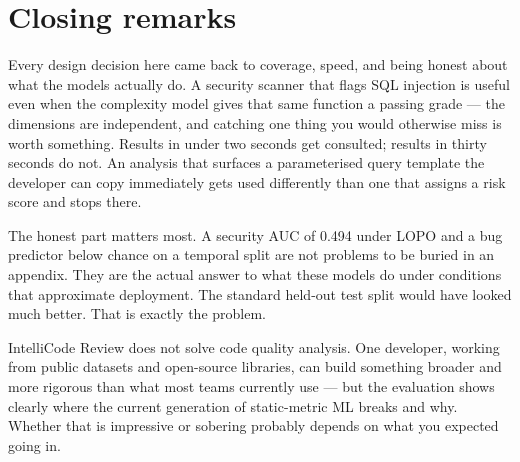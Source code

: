 \documentclass[12pt, oneside]{report}
\begin{document}
\section{Closing remarks}
\label{sec:closing}

Every design decision here came back to coverage, speed, and being honest about what the models actually do. A security scanner that flags SQL injection is useful even when the complexity model gives that same function a passing grade — the dimensions are independent, and catching one thing you would otherwise miss is worth something. Results in under two seconds get consulted; results in thirty seconds do not. An analysis that surfaces a parameterised query template the developer can copy immediately gets used differently than one that assigns a risk score and stops there.

The honest part matters most. A security AUC of 0.494 under LOPO and a bug predictor below chance on a temporal split are not problems to be buried in an appendix. They are the actual answer to what these models do under conditions that approximate deployment. The standard held-out test split would have looked much better. That is exactly the problem.

IntelliCode Review does not solve code quality analysis. One developer, working from public datasets and open-source libraries, can build something broader and more rigorous than what most teams currently use — but the evaluation shows clearly where the current generation of static-metric ML breaks and why. Whether that is impressive or sobering probably depends on what you expected going in.
\end{document}
